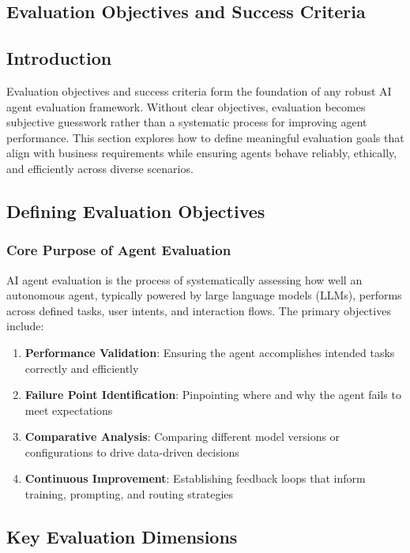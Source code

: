 \begin{TNtwocol}
\section{Evaluation Objectives and Success Criteria }
\subsection{Introduction}
Evaluation objectives and success criteria form the foundation of any robust AI agent evaluation framework. Without clear objectives, evaluation becomes subjective guesswork rather than a systematic process for improving agent performance. This section explores how to define meaningful evaluation goals that align with business requirements while ensuring agents behave reliably, ethically, and efficiently across diverse scenarios.

\subsection{Defining Evaluation Objectives}
\subsubsection{Core Purpose of Agent Evaluation}
AI agent evaluation is the process of systematically assessing how well an autonomous agent, typically powered by large language models (LLMs), performs across defined tasks, user intents, and interaction flows. The primary objectives include:

\begin{enumerate}
    \item \textbf{Performance Validation}: Ensuring the agent accomplishes intended tasks correctly and efficiently
    \item \textbf{Failure Point Identification}: Pinpointing where and why the agent fails to meet expectations
    \item \textbf{Comparative Analysis}: Comparing different model versions or configurations to drive data-driven decisions
    \item \textbf{Continuous Improvement}: Establishing feedback loops that inform training, prompting, and routing strategies
\end{enumerate}

\subsection{Key Evaluation Dimensions}

\end{TNtwocol}
